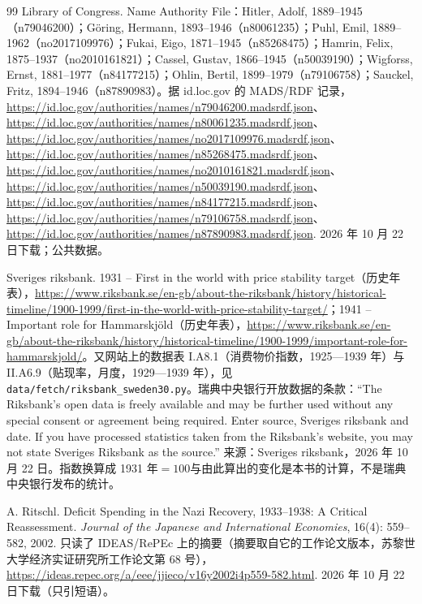 \begin{thebibliography}{99}
 Library of Congress. Name Authority File：Hitler, Adolf, 1889--1945（n79046200）；Göring, Hermann, 1893--1946（n80061235）；Puhl, Emil, 1889--1962（no2017109976）；Fukai, Eigo, 1871--1945（n85268475）；Hamrin, Felix, 1875--1937（no2010161821）；Cassel, Gustav, 1866--1945（n50039190）；Wigforss, Ernst, 1881--1977（n84177215）；Ohlin, Bertil, 1899--1979（n79106758）；Sauckel, Fritz, 1894--1946（n87890983）。据 id.loc.gov 的 MADS/RDF 记录，\url{https://id.loc.gov/authorities/names/n79046200.madsrdf.json}、\url{https://id.loc.gov/authorities/names/n80061235.madsrdf.json}、\url{https://id.loc.gov/authorities/names/no2017109976.madsrdf.json}、\url{https://id.loc.gov/authorities/names/n85268475.madsrdf.json}、\url{https://id.loc.gov/authorities/names/no2010161821.madsrdf.json}、\url{https://id.loc.gov/authorities/names/n50039190.madsrdf.json}、\url{https://id.loc.gov/authorities/names/n84177215.madsrdf.json}、\url{https://id.loc.gov/authorities/names/n79106758.madsrdf.json}、\url{https://id.loc.gov/authorities/names/n87890983.madsrdf.json}. 2026 年 10 月 22 日下载；公共数据。

 Sveriges riksbank. 1931 -- First in the world with price stability target（历史年表），\url{https://www.riksbank.se/en-gb/about-the-riksbank/history/historical-timeline/1900-1999/first-in-the-world-with-price-stability-target/}；1941 -- Important role for Hammarskjöld（历史年表），\url{https://www.riksbank.se/en-gb/about-the-riksbank/history/historical-timeline/1900-1999/important-role-for-hammarskjold/}。又网站上的数据表 I.A8.1（消费物价指数，1925—1939 年）与 II.A6.9（贴现率，月度，1929—1939 年），见 \texttt{data/fetch/riksbank\_sweden30.py}。瑞典中央银行开放数据的条款：“The Riksbank's open data is freely available and may be further used without any special consent or agreement being required. Enter source, Sveriges riksbank and date. If you have processed statistics taken from the Riksbank's website, you may not state Sveriges Riksbank as the source.” 来源：Sveriges riksbank，2026 年 10 月 22 日。指数换算成 1931 年$=100$与由此算出的变化是本书的计算，不是瑞典中央银行发布的统计。

 A. Ritschl. Deficit Spending in the Nazi Recovery, 1933--1938: A Critical Reassessment. \emph{Journal of the Japanese and International Economies}, 16(4): 559--582, 2002. 只读了 IDEAS/RePEc 上的摘要（摘要取自它的工作论文版本，苏黎世大学经济实证研究所工作论文第 68 号），\url{https://ideas.repec.org/a/eee/jjieco/v16y2002i4p559-582.html}. 2026 年 10 月 22 日下载（只引短语）。


\end{thebibliography}
